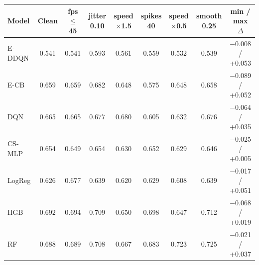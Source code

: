 \begin{tabular}{lcccccccc}
\toprule
Model & Clean & fps$\le$45 & jitter 0.10 & speed $\times$1.5 & spikes 40 & speed $\times$0.5 & smooth 0.25 & min / max $\Delta$ \\
\midrule
E-DDQN & 0.541 & 0.541 & 0.593 & 0.561 & 0.559 & 0.532 & 0.539 & $-$0.008 / +0.053 \\
E-CB & 0.659 & 0.659 & 0.682 & 0.648 & 0.575 & 0.648 & 0.658 & $-$0.089 / +0.052 \\
DQN & 0.665 & 0.665 & 0.677 & 0.680 & 0.605 & 0.632 & 0.676 & $-$0.064 / +0.035 \\
CS-MLP & 0.654 & 0.649 & 0.654 & 0.630 & 0.652 & 0.629 & 0.646 & $-$0.025 / +0.005 \\
LogReg & 0.626 & 0.677 & 0.639 & 0.620 & 0.629 & 0.608 & 0.639 & $-$0.017 / +0.051 \\
HGB & 0.692 & 0.694 & 0.709 & 0.650 & 0.698 & 0.647 & 0.712 & $-$0.068 / +0.019 \\
RF & 0.688 & 0.689 & 0.708 & 0.667 & 0.683 & 0.723 & 0.725 & $-$0.021 / +0.037 \\
\bottomrule
\end{tabular}
